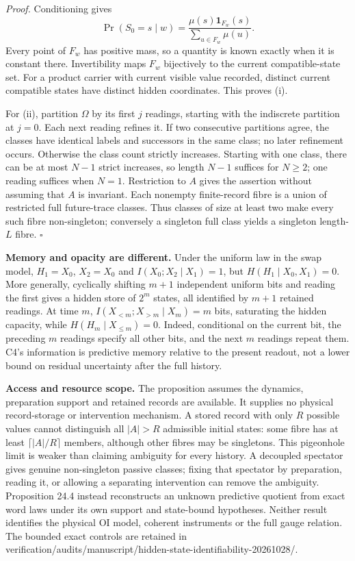 \documentclass[
]{article}
\begin{document}
\emph{Proof.} Conditioning gives
\[\Pr(S_0=s\mid w)=\frac{\mu(s)\mathbf1_{F_w}(s)}{\sum_{u\in F_w}\mu(u)}.\]
Every point of \(F_w\) has positive mass, so a quantity is known exactly
when it is constant there. Invertibility maps \(F_w\) bijectively to the
current compatible-state set. For a product carrier with current visible
value recorded, distinct current compatible states have distinct hidden
coordinates. This proves (i).

For (ii), partition \(\Omega\) by its first \(j\) readings, starting
with the indiscrete partition at \(j=0\). Each next reading refines it.
If two consecutive partitions agree, the classes have identical labels
and successors in the same class; no later refinement occurs. Otherwise
the class count strictly increases. Starting with one class, there can
be at most \(N-1\) strict increases, so length \(N-1\) suffices for
\(N\ge2\); one reading suffices when \(N=1\). Restriction to \(A\) gives
the assertion without assuming that \(A\) is invariant. Each nonempty
finite-record fibre is a union of restricted full future-trace classes.
Thus classes of size at least two make every such fibre non-singleton;
conversely a singleton full class yields a singleton length-\(L\) fibre.
\(\square\)

\textbf{Memory and opacity are different.} Under the uniform law in the
swap model, \(H_1=X_0\), \(X_2=X_0\) and \(I(X_0;X_2\mid X_1)=1\), but
\(H(H_1\mid X_0,X_1)=0\). More generally, cyclically shifting \(m+1\)
independent uniform bits and reading the first gives a hidden store of
\(2^m\) states, all identified by \(m+1\) retained readings. At time
\(m\), \(I(X_{<m};X_{>m}\mid X_m)=m\) bits, saturating the hidden
capacity, while \(H(H_m\mid X_{\le m})=0\). Indeed, conditional on the
current bit, the preceding \(m\) readings specify all other bits, and
the next \(m\) readings repeat them. C4's information is predictive
memory relative to the present readout, not a lower bound on residual
uncertainty after the full history.

\textbf{Access and resource scope.} The proposition assumes the
dynamics, preparation support and retained records are available. It
supplies no physical record-storage or intervention mechanism. A stored
record with only \(R\) possible values cannot distinguish all \(|A|>R\)
admissible initial states: some fibre has at least
\(\lceil |A|/R\rceil\) members, although other fibres may be singletons.
This pigeonhole limit is weaker than claiming ambiguity for every
history. A decoupled spectator gives genuine non-singleton passive
classes; fixing that spectator by preparation, reading it, or allowing a
separating intervention can remove the ambiguity. Proposition 24.4
instead reconstructs an unknown predictive quotient from exact word laws
under its own support and state-bound hypotheses. Neither result
identifies the physical OI model, coherent instruments or the full gauge
relation. The bounded exact controls are retained in
verification/audits/manuscript/hidden-state-identifiability-20261028/.
\end{document}
